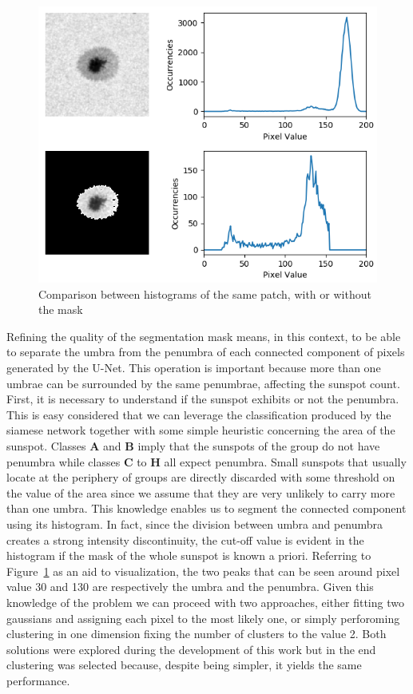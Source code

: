 \begin{figure}[ht!]
  \centering
  \captionsetup{justification=centering}
  \includegraphics[width=\textwidth]{./pictures/histograms}
  \caption{Comparison between histograms of the same patch, with or without the mask}
  \label{fig:histograms}
\end{figure}
Refining the quality of the segmentation mask means, in this context, to be able to separate the umbra from the penumbra of each connected component of pixels generated by the U-Net. This operation is important because more than one umbrae can be surrounded by the same penumbrae, affecting the sunspot count. First, it is necessary to understand if the sunspot exhibits or not the penumbra. This is easy considered that we can leverage the classification produced by the siamese network together with some simple heuristic concerning the area of the sunspot.
\bigbreak
\noindent Classes \textbf{A} and \textbf{B} imply that the sunspots of the group do not have penumbra while classes \textbf{C} to \textbf{H} all expect penumbra. Small sunspots that usually locate at the periphery of groups are directly discarded with some threshold on the value of the area since we assume that they are very unlikely to carry more than one umbra. This knowledge enables us to segment the connected component using its histogram. In fact, since the division between umbra and penumbra creates a strong intensity discontinuity, the cut-off value is evident in the histogram if the mask of the whole sunspot is known a priori. Referring to Figure~\ref{fig:histograms} as an aid to visualization, the two peaks that can be seen around pixel value 30 and 130 are respectively the umbra and the penumbra. Given this knowledge of the problem we can proceed with two approaches, either fitting two gaussians and assigning each pixel to the most likely one, or simply perforoming clustering in one dimension fixing the number of clusters to the value 2. Both solutions were explored during the development of this work but in the end clustering was selected because, despite being simpler, it yields the same performance.
